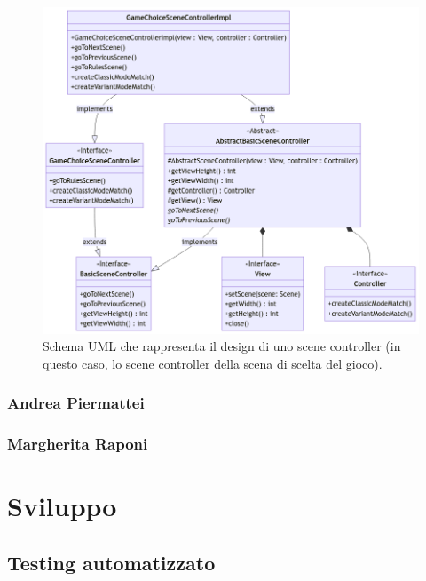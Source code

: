 \documentclass[a4paper,12pt]{report}
\begin{document}
\begin{figure}[H]
\centering
\includegraphics[width=\textwidth]{images/game-choice-scene-controller.png}
\caption{Schema UML che rappresenta il design di uno scene controller (in questo caso, lo scene controller della scena di scelta del gioco).}
\label{images:game-choice-scene-controller}
\end{figure}

\subsection{Andrea Piermattei}

\subsection{Margherita Raponi}



\chapter{Sviluppo}


\section{Testing automatizzato}
\end{document}

